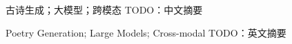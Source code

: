 
\begin{cnabstract}{古诗生成；大模型；跨模态}
  TODO：中文摘要
  
\end{cnabstract}


\begin{enabstract}{Poetry Generation; Large Models; Cross-modal}
  TODO：英文摘要

\end{enabstract}
